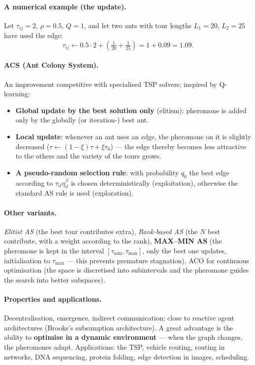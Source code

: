 \documentclass[11pt,a4paper]{article}
\theoremstyle{definition}
\begin{document}
\paragraph{A numerical example (the update).} Let $\tau_{ij} = 2$,
$\rho = 0.5$, $Q = 1$, and let two ants with tour lengths $L_1 = 20$,
$L_2 = 25$ have used the edge:
\[
\tau_{ij} \gets 0.5 \cdot 2 + \left(\tfrac{1}{20} + \tfrac{1}{25}\right)
= 1 + 0.09 = 1.09 .
\]

\paragraph{ACS (Ant Colony System).} An improvement competitive with specialised
TSP solvers; inspired by Q-learning:
\begin{itemize}
\item \textbf{Global update by the best solution only} (elitism): pheromone is
  added only by the globally (or iteration-) best ant.
\item \textbf{Local update}: whenever an ant uses an edge, the pheromone on it
  is slightly decreased ($\tau \gets (1-\xi)\tau + \xi\tau_0$) --- the edge
  thereby becomes less attractive to the others and the variety of the tours
  grows.
\item \textbf{A pseudo-random selection rule}: with probability $q_0$ the best
  edge according to $\tau_{il}\eta_{il}^{\beta}$ is chosen deterministically
  (exploitation), otherwise the standard AS rule is used (exploration).
\end{itemize}

\paragraph{Other variants.}
\emph{Elitist AS} (the best tour contributes extra),
\emph{Rank-based AS} (the $N$ best contribute, with a weight according to the
rank),
\textbf{MAX--MIN AS} (the pheromone is kept in the interval
$[\tau_{\min}, \tau_{\max}]$, only the best one updates, initialisation to
$\tau_{\max}$ --- this prevents premature stagnation),
ACO for continuous optimisation (the space is discretised into subintervals and
the pheromone guides the search into better subspaces).

\paragraph{Properties and applications.} Decentralisation, emergence, indirect
communication; close to reactive agent architectures (Brooks's subsumption
architecture). A great advantage is the ability to \textbf{optimise in a dynamic
environment} --- when the graph changes, the pheromones adapt.
Applications: the TSP, vehicle routing, routing in networks, DNA sequencing,
protein folding, edge detection in images, scheduling.
\end{document}
